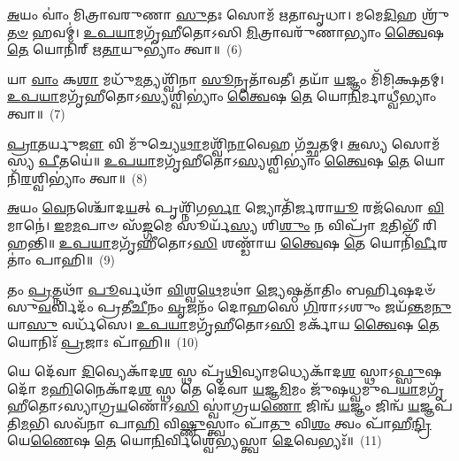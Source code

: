 {\anuvakamend[{𑌆 𑌵𑌾᳴\-\ul{𑌯𑍋} 𑌤𑍍𑌰𑌿𑌚᳴𑌤𑍍𑌵𑌾𑌰𑌿𑍞𑌶𑌤𑍍}]}%

\-\ul{𑌅}\-𑌯𑌂 𑌵𑌾𑌂॑ 𑌮𑌿𑌤𑍍𑌰𑌾𑌵𑌰𑍁𑌣𑌾 \ul{𑌸𑍁}\-𑌤𑌃 𑌸𑍋𑌮᳴ 𑌋𑌤𑌾𑌵𑍃𑌧𑌾। 𑌮𑌮𑍇\-\ul{𑌦𑌿}\-𑌹 𑌶𑍍𑌰𑍁᳴\-\ul{𑌤}\-\-\ul{𑍞} 𑌹𑌵𑌮𑍍॑। \ul{𑌉}\-\-\ul{𑌪}\-\-\ul{𑌯𑌾}\-𑌮𑌗𑍃᳴𑌹𑍀𑌤𑍋\-𑌽𑌸𑌿 \ul{𑌮𑌿}\-𑌤𑍍𑌰𑌾𑌵𑌰𑍁᳴𑌣𑌾𑌭𑍍𑌯𑌾𑌂 \ul{𑌤𑍍𑌵𑍈}\-𑌷 \ul{𑌤𑍇} 𑌯𑍋𑌨𑌿᳴𑌰𑍍 𑌋\-\ul{𑌤𑌾}\-𑌯𑍁\-𑌭𑍍𑌯𑌾𑌂॑ 𑌤𑍍𑌵𑌾॥~(6)

{\anuvakamend[{\-\ul{𑌅}\-𑌯𑌂 𑌵𑌾𑌂॑ 𑌵𑌿𑍞\-\ul{𑌶}\-𑌤𑌿𑌃}]}%

𑌯𑌾 \ul{𑌵𑌾𑌂} 𑌕\-\ul{𑌶𑌾} 𑌮𑌧𑍁᳴\-\ul{𑌮}\-𑌤𑍍𑌯𑌶𑍍𑌵𑌿᳴𑌨𑌾 \ul{𑌸𑍂}\-𑌨𑍃𑌤𑌾᳴𑌵𑌤𑍀। 𑌤𑌯𑌾᳴ \ul{𑌯}\-𑌜𑍍𑌞𑌂 𑌮𑌿᳴𑌮𑌿𑌕𑍍𑌷𑌤𑌮𑍍। \ul{𑌉}\-\-\ul{𑌪}\-\-\ul{𑌯𑌾}\-𑌮𑌗𑍃᳴𑌹𑍀𑌤𑍋\-𑌽\-\ul{𑌸𑍍𑌯}\-𑌶𑍍𑌵𑌿\-𑌭𑍍𑌯𑌾𑌂॑ \ul{𑌤𑍍𑌵𑍈}\-𑌷 \ul{𑌤𑍇} 𑌯𑍋\-\ul{𑌨𑌿}\-𑌰𑍍𑌮𑌾𑌧𑍍𑌵𑍀॑𑌭𑍍𑌯𑌾𑌂 𑌤𑍍𑌵𑌾॥~(7)

{\anuvakamend[{𑌯𑌾 𑌵𑌾᳴\-\ul{𑌮}\-𑌷𑍍𑌟𑌾𑌦᳴𑌶}]}%

\-\ul{𑌪𑍍𑌰𑌾}\-\-\ul{𑌤}\-𑌰𑍍𑌯𑍁\-\ul{𑌜𑍗} 𑌵𑌿 𑌮𑍁᳴𑌚𑍍𑌯𑍇\-\ul{𑌥𑌾}\-𑌮𑌶𑍍𑌵𑌿᳴\-\ul{𑌨𑌾}\-𑌵𑍇𑌹 𑌗᳴𑌚𑍍𑌛𑌤𑌮𑍍। \ul{𑌅}\-𑌸𑍍𑌯 𑌸𑍋𑌮᳴𑌸𑍍𑌯 \ul{𑌪𑍀}\-𑌤𑌯𑍇॑॥ \ul{𑌉}\-\-\ul{𑌪}\-\-\ul{𑌯𑌾}\-𑌮𑌗𑍃᳴𑌹𑍀𑌤𑍋\-𑌽\-\ul{𑌸𑍍𑌯}\-𑌶𑍍𑌵𑌿\-𑌭𑍍𑌯𑌾𑌂॑ \ul{𑌤𑍍𑌵𑍈}\-𑌷 \ul{𑌤𑍇} 𑌯𑍋𑌨𑌿᳴\-\ul{𑌰}\-𑌶𑍍𑌵𑌿\-𑌭𑍍𑌯𑌾𑌂॑ 𑌤𑍍𑌵𑌾॥~(8)

{\anuvakamend[{\-\ul{𑌪𑍍𑌰𑌾}\-\-\ul{𑌤}\-𑌰𑍍𑌯𑍁\-\ul{𑌜𑌾}\-𑌵𑍇\-\ul{𑌕𑌾}\-𑌨𑍍𑌨𑌵𑌿𑍞᳴𑌶𑌤𑌿𑌃}]}%

\-\ul{𑌅}\-𑌯𑌂 \ul{𑌵𑍇}\-𑌨𑌶𑍍𑌚𑍋᳴𑌦\-\ul{𑌯}\-𑌤𑍍 𑌪𑍃𑌶𑍍𑌨𑌿᳴𑌗\-\ul{𑌰𑍍𑌭𑌾} 𑌜𑍍𑌯𑍋𑌤𑌿᳴𑌰𑍍𑌜𑌰𑌾\-\ul{𑌯𑍂} 𑌰𑌜᳴𑌸𑍋 \ul{𑌵𑌿}\-𑌮𑌾𑌨𑍇॑। \ul{𑌇}\-𑌮\-\ul{𑌮}\-𑌪𑌾𑍞 𑌸᳴\-\ul{𑌙𑍍𑌗}\-𑌮𑍇 𑌸𑍂𑌰𑍍𑌯᳴\-\ul{𑌸𑍍𑌯} 𑌶𑌿\-\ul{𑌶𑍁𑌂} 𑌨 𑌵𑌿𑌪𑍍𑌰𑌾᳴ \ul{𑌮}\-𑌤𑌿𑌭𑍀᳴ 𑌰𑌿𑌹𑌨𑍍𑌤𑌿॥ \ul{𑌉}\-\-\ul{𑌪}\-\-\ul{𑌯𑌾}\-𑌮𑌗𑍃᳴𑌹𑍀𑌤𑍋\-𑌽\-\ul{𑌸𑌿} 𑌶𑌣𑍍𑌡𑌾᳴𑌯 \ul{𑌤𑍍𑌵𑍈}\-𑌷 \ul{𑌤𑍇} 𑌯𑍋𑌨𑌿᳴\-\ul{𑌰𑍍𑌵𑍀}\-𑌰𑌤𑌾𑌂॑ 𑌪𑌾𑌹𑌿॥~(9)

{\anuvakamend[{\-\ul{𑌅}\-𑌯𑌂 \ul{𑌵𑍇}\-𑌨𑌃 𑌪𑌞𑍍𑌚᳴𑌵𑌿𑍞𑌶𑌤𑌿𑌃}]}%

𑌤𑌂 \ul{𑌪𑍍𑌰}\-𑌤𑍍𑌨𑌥𑌾᳴ \ul{𑌪𑍂}\-𑌰𑍍𑌵𑌥𑌾᳴ \ul{𑌵𑌿}\-𑌶𑍍𑌵\-\ul{𑌥𑍇}\-𑌮𑌥𑌾॑ \ul{𑌜𑍍𑌯𑍇}\-𑌷𑍍𑌠𑌤𑌾᳴𑌤𑌿𑌂 𑌬𑌰𑍍\mbox{}\-\ul{𑌹𑌿}\-𑌷𑌦𑍞᳴ 𑌸𑍁\-\ul{𑌵}\-𑌰𑍍𑌵𑌿𑌦𑌂᳴ 𑌪𑍍𑌰𑌤𑍀\-\ul{𑌚𑍀}\-𑌨𑌂 \ul{𑌵𑍃}\-𑌜𑌨𑌂᳴ 𑌦𑍋𑌹𑌸𑍇 \ul{𑌗𑌿}\-𑌰𑌾\-𑌽\-𑌽𑌶𑍁𑌂 𑌜𑌯᳴\-\ul{𑌨𑍍𑌤}\-𑌮\-\ul{𑌨𑍁} 𑌯𑌾\-\ul{𑌸𑍁} 𑌵𑌰𑍍𑌧᳴𑌸𑍇। \ul{𑌉}\-\-\ul{𑌪}\-\-\ul{𑌯𑌾}\-𑌮𑌗𑍃᳴𑌹𑍀𑌤𑍋\-𑌽\-\ul{𑌸𑌿} 𑌮𑌰𑍍𑌕𑌾᳴𑌯 \ul{𑌤𑍍𑌵𑍈}\-𑌷 \ul{𑌤𑍇} 𑌯𑍋𑌨𑌿𑌃᳴ \ul{𑌪𑍍𑌰}\-𑌜𑌾𑌃 𑌪𑌾᳴𑌹𑌿॥~(10)

{\anuvakamend[{𑌤𑍞 𑌷𑌡𑍍𑌵𑌿𑍞᳴𑌶𑌤𑌿𑌃}]}%

𑌯𑍇 𑌦𑍇᳴𑌵𑌾 \ul{𑌦𑌿}\-𑌵𑍍𑌯𑍇𑌕𑌾᳴\-𑌦\-\ul{𑌶} 𑌸𑍍𑌥 𑌪𑍃᳴\-\ul{𑌥𑌿}\-𑌵𑍍𑌯𑌾𑌮𑌧𑍍𑌯𑍇𑌕𑌾᳴\-𑌦\-\ul{𑌶} 𑌸𑍍𑌥𑌾\-𑌽\-\ul{𑌫𑍍𑌸𑍁}\-𑌷𑌦𑍋᳴ 𑌮\-\ul{𑌹𑌿}\-𑌨𑍈𑌕𑌾᳴\-𑌦\-\ul{𑌶} 𑌸𑍍𑌥 𑌤𑍇 𑌦𑍇᳴𑌵𑌾 \ul{𑌯}\-𑌜𑍍𑌞\-\ul{𑌮𑌿}\-𑌮𑌂 𑌜𑍁᳴𑌷𑌧𑍍𑌵𑌮𑍁𑌪\-\ul{𑌯𑌾}\-𑌮𑌗𑍃᳴𑌹𑍀𑌤𑍋\-𑌽𑌸𑍍𑌯𑌾𑌗𑍍𑌰\-\ul{𑌯}\-𑌣𑍋᳴\-𑌽\-\ul{𑌸𑌿} 𑌸𑍍𑌵𑌾॑𑌗𑍍𑌰𑌯\-\ul{𑌣𑍋} 𑌜𑌿𑌨𑍍𑌵᳴ \ul{𑌯}\-𑌜𑍍𑌞𑌂 𑌜𑌿𑌨𑍍𑌵᳴ \ul{𑌯}\-𑌜𑍍𑌞𑌪᳴𑌤𑌿\-\ul{𑌮}\-𑌭𑌿 𑌸𑌵᳴𑌨𑌾 𑌪𑌾\-\ul{𑌹𑌿} 𑌵𑌿\-\ul{𑌷𑍍𑌣𑍁}\-𑌸𑍍𑌤𑍍𑌵𑌾𑌂 𑌪𑌾᳴\-\ul{𑌤𑍁} 𑌵𑌿\-\ul{𑌶𑌂} 𑌤𑍍𑌵𑌂 𑌪𑌾᳴𑌹𑍀\-\ul{𑌨𑍍𑌦𑍍𑌰𑌿}\-𑌯𑍇\-\ul{𑌣𑍈}\-𑌷 \ul{𑌤𑍇} 𑌯𑍋\-\ul{𑌨𑌿}\-𑌰𑍍𑌵𑌿𑌶𑍍𑌵𑍇॑𑌭𑍍𑌯𑌸𑍍𑌤𑍍𑌵𑌾 \ul{𑌦𑍇}\-𑌵𑍇𑌭𑍍𑌯𑌃᳴॥~(11)

